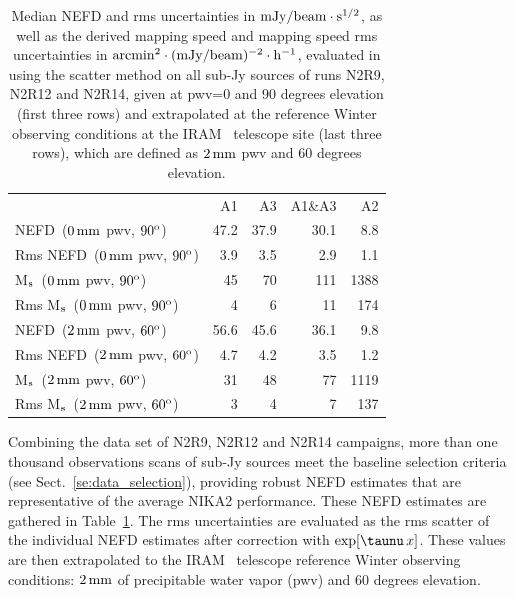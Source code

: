 \begin{table}[!thbp]
  \begin{center}
    \caption[NEFD estimates on all sub-Jy sources]{Median NEFD and rms
      uncertainties in $\rm{mJy}/{beam}\cdot s^{1/2}$, as well as the derived mapping
      speed and mapping speed rms uncertainties in
    $\rm{arcmin}^2\cdot (\rm{mJy}/{beam})^{-2}\cdot\rm{h}^{-1}$, evaluated
      in using the scatter method on all sub-Jy sources of runs N2R9, N2R12
      and N2R14, given at pwv=0 and 90 degrees elevation (first three rows) and extrapolated at the
      reference Winter observing conditions at the IRAM
      \trentemetre\ telescope site (last three rows), which are defined
      as $2\,\rm{mm}$ pwv and 60 degrees elevation.}
    \label{tab:nefd_astro}
    \begin{tabular}{lrrrr}
      \hline\hline
      \noalign{\smallskip}
                    & A1      &   A3    &   A1\&A3 &    A2 \\
      \noalign{\smallskip}
      \hline
      \noalign{\smallskip}
      NEFD\, \small{($0\,\rm{mm}$ pwv, $90^{\rm{o}}$)}             & 47.2    & 37.9    &    30.1  &    8.8   \\
      Rms NEFD\, \small{($0\,\rm{mm}$ pwv, $90^{\rm{o}}$)}         &  3.9    &  3.5    &     2.9  &    1.1   \\
      M$_{\rm{s}}$\, \small{($0\,\rm{mm}$ pwv, $90^{\rm{o}}$)}      & 45      &  70     &    111   &   1388   \\
      Rms M$_{\rm{s}}$\, \small{($0\,\rm{mm}$ pwv, $90^{\rm{o}}$)}  &  4      &   6     &     11   &    174   \\
      \hline
      \noalign{\smallskip}
      NEFD\, \small{($2\,\rm{mm}$ pwv, $60^{\rm{o}}$)}             & 56.6    & 45.6    &    36.1  &    9.8   \\
      Rms NEFD\, \small{($2\,\rm{mm}$ pwv, $60^{\rm{o}}$)}         &  4.7    & 4.2     &     3.5  &    1.2   \\
      M$_{\rm{s}}$\, \small{($2\,\rm{mm}$ pwv, $60^{\rm{o}}$)}      &  31    & 48       &    77   &   1119   \\
      Rms M$_{\rm{s}}$\, \small{($2\,\rm{mm}$ pwv, $60^{\rm{o}}$)}  &   3    &  4       &     7     &  137   \\
      \hline
    \end{tabular}
\end{center}
\end{table}

Combining the data set of N2R9, N2R12 and N2R14 campaigns,
more than one thousand observations scans of sub-Jy sources meet the
baseline selection criteria (see Sect.~\ref{se:data_selection}),
providing robust NEFD estimates that are representative of the
average NIKA2 performance. These NEFD estimates are gathered in
Table~\ref{tab:nefd_astro}.
The rms uncertainties are evaluated as the rms scatter of the
individual NEFD estimates after correction with
$\exp[\taunu\,x]$. These values are then extrapolated to the IRAM
\trentemetre\ telescope reference Winter observing conditions: $2\,\rm{mm}$
of precipitable water vapor (pwv) and $60$ degrees elevation.



